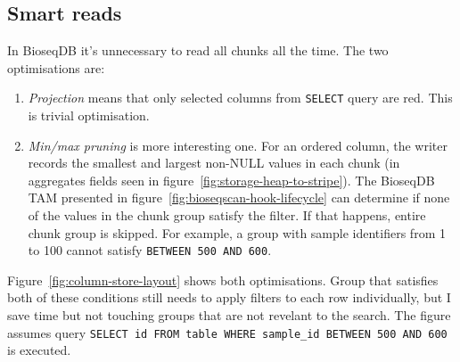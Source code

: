 \subsection{Smart reads}

In BioseqDB it's unnecessary to read all chunks all the time. The two optimisations are:
\begin{enumerate}
  \item \emph{Projection} means that only selected columns from \texttt{SELECT} query are red. This is trivial optimisation.
  \item \emph{Min/max pruning} is more interesting one. For an ordered column,
    the writer records the smallest and largest non-NULL values in each chunk (in aggregates fields seen in figure~\ref{fig:storage-heap-to-stripe}).
    The BioseqDB TAM presented in figure~\ref{fig:bioseqscan-hook-lifecycle} can determine if none of the values in the chunk group satisfy the filter.
    If that happens, entire chunk group is skipped.
    For example, a group with sample identifiers from 1 to 100 cannot satisfy \texttt{BETWEEN 500 AND 600}.
\label{lst:storage-minmax-pruning}
\end{enumerate}

Figure~\ref{fig:column-store-layout} shows both optimisations. Group that satisfies both of these conditions still needs to apply filters to each row individually, but I save time but not touching groups that are not revelant to the search.
The figure assumes query \texttt{SELECT id FROM table WHERE sample\_id BETWEEN 500 AND 600} is executed.

